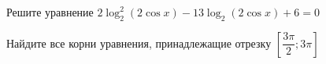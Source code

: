 \begin{ex}
	\begin{condition}
		\begin{enumcols}[label=\asbuk*)]
			\item Решите уравнение \( 2\log_2^2 (2\cos x ) - 13\log_2 (2\cos x) + 6 = 0\)
			\item Найдите все корни уравнения, принадлежащие отрезку \( \left[\dfrac{3\pi}{2};3\pi\right] \)
		\end{enumcols}
	\end{condition}
\end{ex}